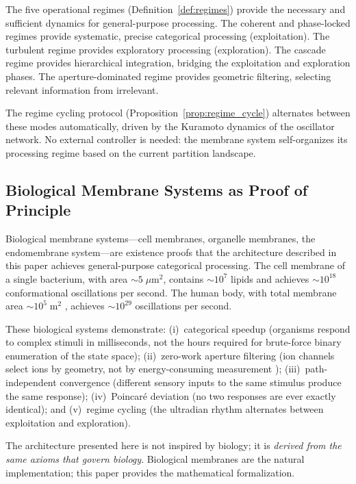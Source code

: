 \documentclass[twocolumn,10pt]{article}
\theoremstyle{remark}
\begin{document}
The five operational regimes (Definition~\ref{def:regimes}) provide the necessary and sufficient dynamics for general-purpose processing. The coherent and phase-locked regimes provide systematic, precise categorical processing (exploitation). The turbulent regime provides exploratory processing (exploration). The cascade regime provides hierarchical integration, bridging the exploitation and exploration phases. The aperture-dominated regime provides geometric filtering, selecting relevant information from irrelevant.

The regime cycling protocol (Proposition~\ref{prop:regime_cycle}) alternates between these modes automatically, driven by the Kuramoto dynamics of the oscillator network. No external controller is needed: the membrane system self-organizes its processing regime based on the current partition landscape.

\subsection{Biological Membrane Systems as Proof of Principle}

Biological membrane systems---cell membranes, organelle membranes, the endomembrane system---are existence proofs that the architecture described in this paper achieves general-purpose categorical processing. The cell membrane of a single bacterium, with area $\sim 5\;\mu\mathrm{m}^2$, contains $\sim 10^7$ lipids and achieves $\sim 10^{18}$ conformational oscillations per second. The human body, with total membrane area $\sim 10^5\;\mathrm{m}^2$ \cite{alberts2015}, achieves $\sim 10^{29}$ oscillations per second.

These biological systems demonstrate: (i)~categorical speedup (organisms respond to complex stimuli in milliseconds, not the hours required for brute-force binary enumeration of the state space); (ii)~zero-work aperture filtering (ion channels select ions by geometry, not by energy-consuming measurement \cite{hodgkin1952}); (iii)~path-independent convergence (different sensory inputs to the same stimulus produce the same response); (iv)~Poincar\'e deviation (no two responses are ever exactly identical); and (v)~regime cycling (the ultradian rhythm alternates between exploitation and exploration).

The architecture presented here is not inspired by biology; it is \emph{derived from the same axioms that govern biology}. Biological membranes are the natural implementation; this paper provides the mathematical formalization.
\end{document}
